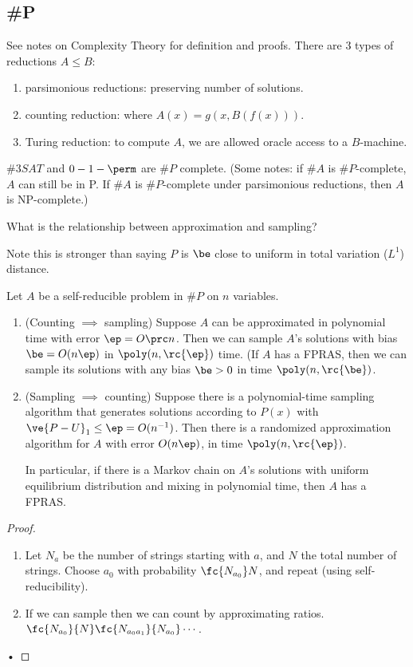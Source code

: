 \subsection{\#P}
See notes on Complexity Theory for definition and proofs.
There are 3 types of reductions $A\le B$:
\begin{enumerate}
\item
parsimonious reductions: preserving number of solutions.
\item
counting reduction: where $A(x)=g(x,B(f(x)))$.
\item
Turing reduction: to compute $A$, we are allowed oracle access to a $B$-machine.
\end{enumerate}
$\#3SAT$ and $0-1-\perm$ are $\#P$ complete.
(Some notes: if $\#A$ is $\#P$-complete, $A$ can still be in P. If $\#A$ is $\#P$-complete under parsimonious reductions, then $A$ is NP-complete.)


What is the relationship between approximation and sampling?



Note this is stronger than saying $P$ is $\be$ close to uniform in total variation ($L^1$) distance.

\begin{thm}
Let $A$ be a self-reducible problem in $\#P$ on $n$ variables.
\begin{enumerate}
\item (Counting $\implies$ sampling)
Suppose $A$ can be approximated in polynomial time with error $\ep=O\prc n$. Then we can sample $A$'s solutions with bias $\be=O(n\ep)$ in $\poly(n,\rc{\ep})$ time. (If $A$ has a FPRAS, then we can sample its solutions with any bias $\be>0$ in time $\poly(n,\rc{\be})$.
\item (Sampling $\implies$ counting)
Suppose there is a polynomial-time sampling algorithm that generates solutions according to $P(x)$ with $\ve{P-U}_1\le \ep=O(n^{-1})$. Then there is a randomized approximation algorithm for $A$ with error $O(n\ep)$, in time $\poly(n,\rc{\ep})$.

In particular, if there is a Markov chain on $A$'s solutions with uniform equilibrium distribution and mixing in polynomial time, then $A$ has a FPRAS.
\end{enumerate}
\end{thm}
\begin{proof}
\begin{enumerate}
\item
Let $N_a$ be the number of strings starting with $a$, and $N$ the total number of strings. 
Choose $a_0$ with probability $\fc{N_{a_0}}N$, and repeat (using self-reducibility).
\item
If we can sample then we can count by approximating ratios. $\fc{N_{a_0}}{N}\fc{N_{a_0a_1}}{N_{a_0}}\cdots$. %
\end{enumerate}•
\end{proof}
